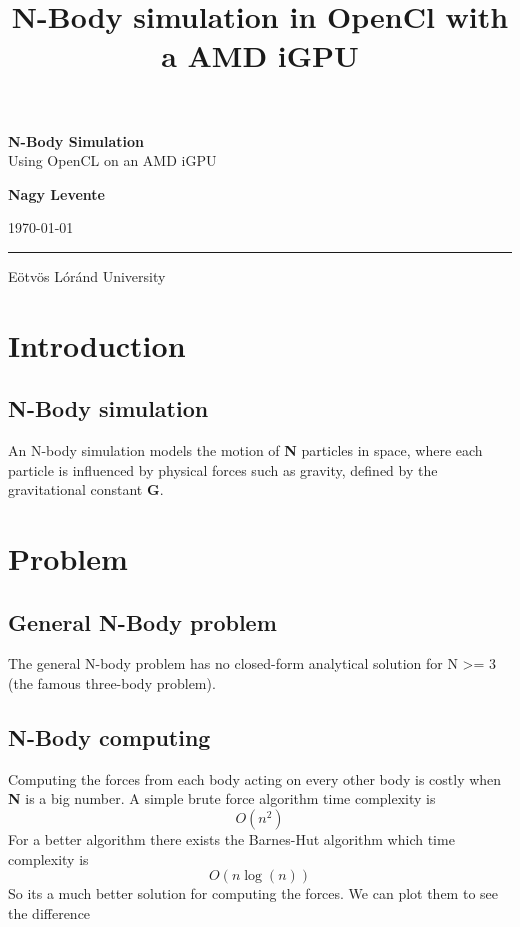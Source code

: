 \documentclass[12pt]{article}
\title{N-Body simulation in OpenCl with a AMD iGPU}
\author{}
\date{}
\begin{document}
\begin{titlepage}
    \centering

    \vspace*{2cm}

    {\Huge \textbf{N-Body Simulation}}\\[0.4cm]
    {\Large Using OpenCL on an AMD iGPU}

    \vspace{2cm}

    {\Large \textbf{Nagy Levente}}

    \vspace{1cm}

    {\large \today}

    \vfill

    \rule{\textwidth}{0.4pt}

    \vspace{0.3cm}

    {\large
    Eötvös Lóránd University
    }

\end{titlepage}

\pagebreak

\tableofcontents


\pagebreak

\section{Introduction}

\subsection{N-Body simulation}

An N-body simulation models the motion of \textbf{N} particles in space,
where each particle is influenced by physical forces such as gravity,
defined by the gravitational constant \textbf{G}.

\section{Problem}
\subsection{General N-Body problem}

The general N-body problem has no closed-form analytical solution for N >= 3 (the famous three-body problem).

\subsection{N-Body computing}
Computing the forces from each body acting on every other body is costly when \textbf{N} is a big number.
A simple brute force algorithm time complexity is \[O(n^2)\]
For a better algorithm there exists the Barnes-Hut algorithm which time complexity is \[O(n \log(n))\]
So its a much better solution for computing the forces. We can plot them to see the difference
\end{document}
